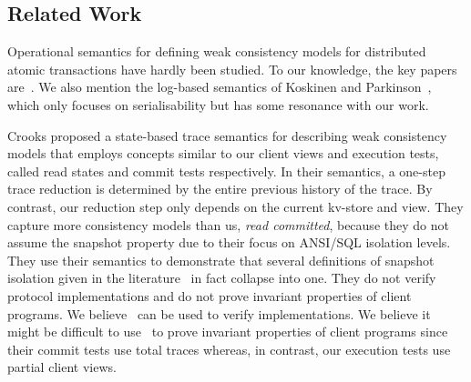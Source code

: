 \subsection{Related Work} 
\label{sec:newrelated}

Operational semantics for defining weak consistency models for
distributed atomic transactions have hardly been
studied. To our knowledge, the key papers
are~\cite{seebelieve,sureshConcur,alonetogether}. 
We also mention the log-based semantics of Koskinen and Parkinson~\citet{push-pull},
which only focuses on serialisability but has some resonance with our work. 

Crooks \etal\citet{seebelieve} proposed a state-based trace
semantics for describing weak consistency models that employs concepts
similar to our client views and execution tests, called read states and
commit tests respectively.  In their semantics, a one-step trace
reduction is determined by the entire previous history of the trace.
By contrast, our reduction step only depends on the current kv-store
and view.  They capture more consistency models than us, \eg\emph{
  read committed}, because they do not assume the snapshot property
due to their focus on ANSI/SQL isolation levels. They use their semantics to 
demonstrate that 
several definitions of snapshot isolation given in the
literature~\cite{si,lazy-si,geo-si} in fact collapse into one.  They do not verify
protocol implementations and do not prove invariant properties of
client programs.  We believe~\cite{seebelieve} can be used to verify
implementations. We believe it might be  difficult to use~\cite{seebelieve}
to prove invariant properties of client programs since their commit tests 
use  total traces whereas, in contrast,  our execution tests
use partial client views. 




